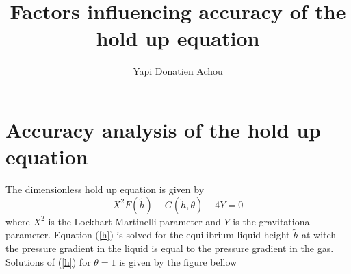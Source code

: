 \documentclass[10pt,a4paper]{report}
\author{Yapi Donatien Achou}
\title{Factors influencing accuracy of the hold up equation}
\begin{document}
\maketitle
\section{Accuracy analysis of the hold up equation}
The dimensionless hold up equation is given by 
\begin{equation}\label{h}
X^{2}F(\tilde{h})-G(\tilde{h},\theta) +4Y = 0
\end{equation}
where $X^{2}$ is the Lockhart-Martinelli parameter and $Y$ is the gravitational parameter. Equation (\ref{h}) is solved for the equilibrium liquid height $\tilde{h}$ at witch the pressure gradient in the liquid is equal to the pressure gradient in the gas. Solutions of (\ref{h}) for $\theta = 1$
is given by the figure bellow
\end{document}
